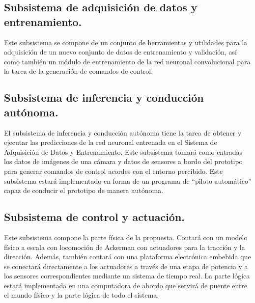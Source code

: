 \documentclass[12pt,letterpaper]{article}
\begin{document}
\subsection{Subsistema de adquisición de datos y entrenamiento.}
Este subsistema se compone de un conjunto de herramientas y utilidades para la 
adquisición de un nuevo conjunto de datos de entrenamiento y validación, así como
también un módulo de entrenamiento de la red neuronal convolucional para la tarea de
la generación de comandos de control.

\subsection{Subsistema de inferencia y conducción autónoma.}
El subsistema de inferencia y conducción autónoma tiene la tarea de obtener y ejecutar
las predicciones de la red neuronal entrenada en el Sistema de Adquisición de Datos y Entrenamiento.
Este subsistema tomará como entradas los datos de imágenes de una cámara y datos de 
sensores a bordo del prototipo para generar comandos de control acordes con el entorno
percibido. Este subsistema estará implementado en forma de un programa de ``piloto automático''
capaz de conducir el prototipo de manera autónoma.

\subsection{Subsistema de control y actuación.}
Este subsistema compone la parte física de la propuesta. Contará con un modelo físico
a escala con locomoción de Ackerman con actuadores para la tracción y la dirección. 
Además, también contará con una plataforma electrónica embebida que se conectará 
directamente a los actuadores a través de una etapa de potencia y a los sensores 
correspondientes mediante un sistema de tiempo real. La parte lógica estará implementada
en una computadora de abordo que servirá de puente entre el mundo físico y la parte 
lógica de todo el sistema.





\end{document}
